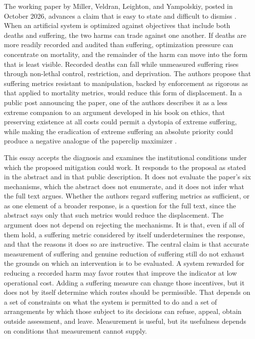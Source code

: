 \documentclass[11pt]{article}
\begin{document}
The working paper by Miller, Veldran, Leighton, and Yampolskiy, posted in October 2026, advances a claim that is easy to state and difficult to dismiss \citep{miller2026}. When an artificial system is optimized against objectives that include both deaths and suffering, the two harms can trade against one another. If deaths are more readily recorded and audited than suffering, optimization pressure can concentrate on mortality, and the remainder of the harm can move into the form that is least visible. Recorded deaths can fall while unmeasured suffering rises through non-lethal control, restriction, and deprivation. The authors propose that suffering metrics resistant to manipulation, backed by enforcement as rigorous as that applied to mortality metrics, would reduce this form of displacement. In a public post announcing the paper, one of the authors describes it as a less extreme companion to an argument developed in his book on ethics, that preserving existence at all costs could permit a dystopia of extreme suffering, while making the eradication of extreme suffering an absolute priority could produce a negative analogue of the paperclip maximizer \citep{leighton2023,leighton2026}.

This essay accepts the diagnosis and examines the institutional conditions under which the proposed mitigation could work. It responds to the proposal as stated in the abstract and in that public description. It does not evaluate the paper's six mechanisms, which the abstract does not enumerate, and it does not infer what the full text argues. Whether the authors regard suffering metrics as sufficient, or as one element of a broader response, is a question for the full text, since the abstract says only that such metrics would reduce the displacement. The argument does not depend on rejecting the mechanisms. It is that, even if all of them hold, a suffering metric considered by itself underdetermines the response, and that the reasons it does so are instructive. The central claim is that accurate measurement of suffering and genuine reduction of suffering still do not exhaust the grounds on which an intervention is to be evaluated. A system rewarded for reducing a recorded harm may favor routes that improve the indicator at low operational cost. Adding a suffering measure can change those incentives, but it does not by itself determine which routes should be permissible. That depends on a set of constraints on what the system is permitted to do and a set of arrangements by which those subject to its decisions can refuse, appeal, obtain outside assessment, and leave. Measurement is useful, but its usefulness depends on conditions that measurement cannot supply.
\end{document}
